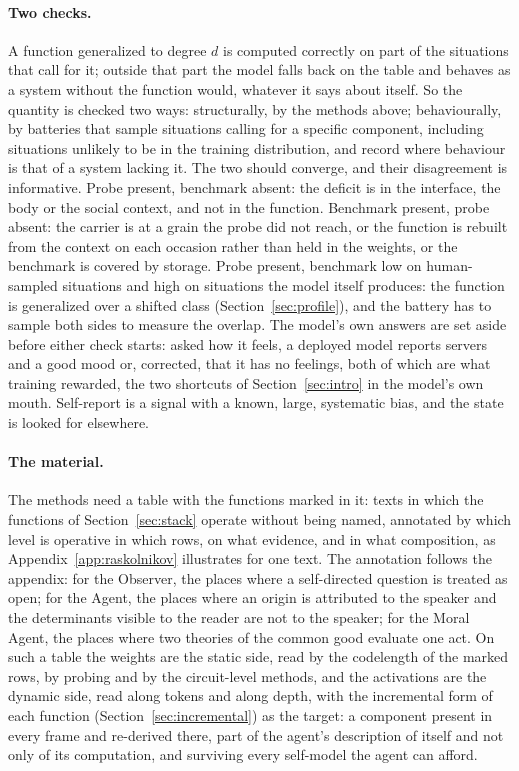 \paragraph{Two checks.}
A function generalized to degree $d$ is computed correctly on part of the situations that call for it;
outside that part the model falls back on the table and behaves as a system without the function
would, whatever it says about itself. So the quantity is checked two ways: structurally, by the
methods above; behaviourally, by batteries that sample situations calling for a specific component,
including situations unlikely to be in the training distribution, and record where behaviour is that
of a system lacking it. The two should converge, and their disagreement is informative. Probe present,
benchmark absent: the deficit is in the interface, the body or the social context, and not in the
function. Benchmark present, probe absent: the carrier is at a grain the probe did not reach, or the
function is rebuilt from the context on each occasion rather than held in the weights, or the
benchmark is covered by storage. Probe present, benchmark low on human-sampled situations and high on
situations the model itself produces: the function is generalized over a shifted class
(Section~\ref{sec:profile}), and the battery has to sample both sides to measure the overlap. The
model's own answers are set aside before either check starts: asked how it feels, a deployed model
reports servers and a good mood or, corrected, that it has no feelings, both of which are what training
rewarded, the two shortcuts of Section~\ref{sec:intro} in the model's own mouth. Self-report is a
signal with a known, large, systematic bias, and the state is looked for elsewhere.

\paragraph{The material.}
The methods need a table with the functions marked in it: texts in which the functions of
Section~\ref{sec:stack} operate without being named, annotated by which level is operative in which
rows, on what evidence, and in what composition, as Appendix~\ref{app:raskolnikov} illustrates for one
text. The annotation follows the appendix: for the Observer, the places where a self-directed question
is treated as open; for the Agent, the places where an origin is attributed to the speaker and the
determinants visible to the reader are not to the speaker; for the Moral Agent, the places where two
theories of the common good evaluate one act. On such a table the weights are the static side, read by
the codelength of the marked rows, by probing and by the circuit-level methods, and the activations
are the dynamic side, read along tokens and along depth, with the incremental form of each function
(Section~\ref{sec:incremental}) as the target: a component present in every frame and re-derived
there, part of the agent's description of itself and not only of its computation, and surviving every
self-model the agent can afford.

